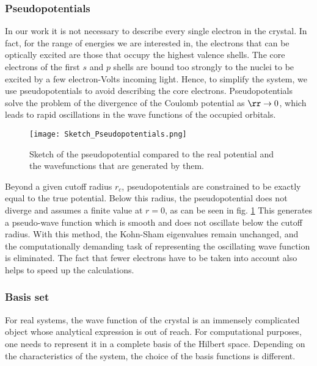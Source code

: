 \subsubsection{Pseudopotentials}
In our work it is not necessary to describe every single electron in the crystal. In fact, for the range of energies we are interested in, the electrons that can be optically excited are those that occupy the highest valence shells.
The core electrons of the first $s$ and $p$ shells are bound too strongly to the nuclei to be excited by a few electron-Volts incoming light. Hence, to simplify the system, we use pseudopotentials to avoid describing the core electrons. Pseudopotentials solve the problem of the divergence of the Coulomb potential as $\rr \to 0$, which leads to rapid oscillations in the wave functions of the occupied orbitals.
\begin{figure}[h!tbp]
	\vspace{0.5cm}
	\setcapindent{2em}
	\centering
	\texttt{[image: Sketch\_Pseudopotentials.png]}
	\caption{Sketch of the pseudopotential compared to the real potential and the wavefunctions that are generated by them.}
	\label{fig:sketch_pseudo}
\end{figure}
Beyond a given cutoff radius $r_c$, pseudopotentials are constrained to be exactly equal to the true potential. Below this radius, the pseudopotential does not diverge and assumes a finite value at $r=0$, as can be seen in fig. \ref{fig:sketch_pseudo} This generates a pseudo-wave function which is smooth and does not oscillate below the cutoff radius. With this method, the Kohn-Sham eigenvalues remain unchanged, and the computationally demanding task of representing the oscillating wave function is eliminated. The fact that fewer electrons have to be taken into account also helps to speed up the calculations.
%

\subsubsection{Basis set}
For real systems, the wave function of the crystal is an immensely complicated object whose analytical expression is out of reach. For computational purposes, one needs to represent it in a complete basis of the Hilbert space. Depending on the characteristics of the system, the choice of the basis functions is different.

